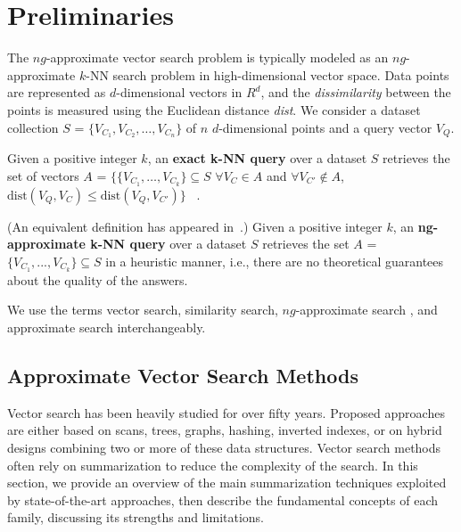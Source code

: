 \section{Preliminaries}
\label{sec:preliminaries}

\label{subsec:preliminaries-definitions}
The $ng$-approximate vector search problem is typically modeled as an $ng$-approximate $k$-NN search problem in high-dimensional vector space. 
Data points are represented as $d$-dimensional vectors in ${R}^d$, and the \textit{dissimilarity} between the points is measured using the Euclidean distance \textit{dist}. We consider a dataset collection 
$S$ = $\{V_{C_1}, V_{C_2}, \ldots, V_{C_n}\}$
 of $n$ $d$-dimensional points and a query vector $V_Q$.




\begin{defn} \label{def:knnquery}
    Given a positive integer $k$, an \textbf{exact k-NN query} over a dataset $S$ retrieves the set of vectors $A$ = $\{ \{V_{C_1}, \ldots, V_{C_k}\} \subseteq S$ \text{|} 
    $\forall V_C \in A $
    and 
    $\forall V_{C'} \notin A$, 
    $\text{dist}\left(V_Q, V_C\right) \leq \text{dist}\left(V_Q, V_{C'}\right) \}$
    ~\cite{lernaeanhydra2}.
\end{defn}


\begin{defn} \label{def:appmatch} (An equivalent definition has appeared in~\cite{lernaeanhydra2}.)
	Given a positive integer $k$, an \textbf{ng-approximate k-NN query} over a dataset ${S}$ retrieves the set ${A}$ = $ \{V_{C_1},...,V_{C_k}\} \subseteq {S}$ in a heuristic manner, i.e., there are no theoretical guarantees about the quality of the answers. 
\end{defn}    




We use the terms vector search, similarity search, $ng$-approximate search%
, and approximate search %
interchangeably.


\subsection{Approximate Vector Search Methods}
Vector search has been heavily studied  for over fifty years. 
Proposed approaches are either based on scans, trees, graphs, hashing, inverted indexes, or on hybrid designs combining two or more of these data structures. 
Vector search methods often rely on summarization to reduce the complexity of the search. In this section, we provide an overview of the main summarization techniques exploited by state-of-the-art approaches, then describe the fundamental concepts of each family, discussing its strengths and limitations.

